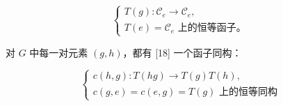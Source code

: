 \begingroup
\makeatletter
\tagsleft@true
\let\veqno\@@leqno
\makeatother
\begin{equation}
  \begin{cases}
    T(g)\colon\mathcal C_e\longrightarrow\mathcal C_e,\\[0.4em]
    T(e)=\text{$\mathcal C_e$ 上的恒等函子。}
  \end{cases}
  \tag{1.2.1.1}
\end{equation}
\endgroup

对 $G$ 中每一对元素 $(g,h)$，都有 [18] 一个函子同构：

\begingroup
\makeatletter
\tagsleft@true
\let\veqno\@@leqno
\makeatother
\begin{equation}
  \begin{cases}
    c(h,g)\colon T(hg)\longrightarrow T(g)T(h),\\[0.4em]
    c(g,e)=c(e,g)=\text{$T(g)$ 上的恒等同构}
  \end{cases}
  \tag{1.2.1.2}
\end{equation}
\endgroup

